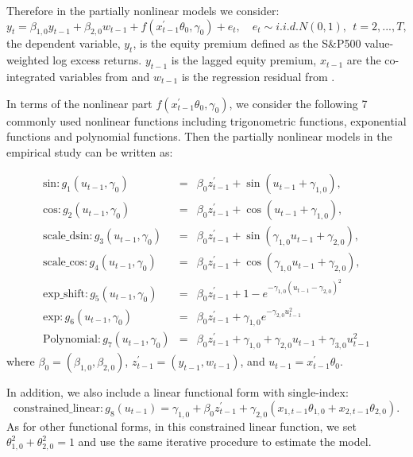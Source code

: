 \documentclass[a4paper,12pt,times,numbered,print,index]{report}
\numberwithin{equation}{section}
\begin{document}
Therefore in the partially nonlinear models we consider: 
$$
y_{t} = \beta_{1,0} y_{t-1} + \beta_{2,0} w_{t-1} + f\left( x_{t-1}^{\prime }\theta _{0},\gamma _{0}\right) +e_{t}, \quad
e_{t}\sim i.i.d.N\left( 0,1\right) ,\ \ t=2,...,T,
$$
the dependent variable, $y_t$, is the equity premium defined as the S\&P500 value-weighted log excess returns. $y_{t-1}$ is the lagged equity premium, $x_{t-1}$ are the co-integrated variables from \cite{zhou2018semiparametric} and $w_{t-1}$ is the regression residual from \cite{lettau2001consumption}. 

In terms of the nonlinear part $f\left( x_{t-1}^{\prime }\theta _{0},\gamma _{0}\right)$, we consider the following 7 commonly used nonlinear functions including trigonometric functions, exponential functions and polynomial functions. Then the partially nonlinear models in the empirical study can be written as:

\begin{eqnarray*}
	\text{sin}: g_{1}\left( u_{t-1},\gamma _{0}\right) &=& \beta _{0} z_{t-1}^{\prime} + \sin \left( u_{t-1}+\gamma_{1,0}\right),  \\
	\text{cos}: g_{2}\left( u_{t-1},\gamma _{0}\right) &=& \beta _{0} z_{t-1}^{\prime} + \cos \left( u_{t-1}+\gamma_{1,0}\right), \\
	\text{scale\_dsin}: g_{3}\left( u_{t-1},\gamma_{0}\right) &=& \beta _{0} z_{t-1}^{\prime} + \sin \left( \gamma_{1,0}u_{t-1}+\gamma_{2,0}\right),  \\
	\text{scale\_cos}: g_{4}\left( u_{t-1},\gamma_{0}\right) &=& \beta _{0} z_{t-1}^{\prime} + \cos \left( \gamma_{1,0}u_{t-1}+\gamma_{2,0}\right), \\
	\text{exp\_shift}: g_{5}\left( u_{t-1}, \gamma_{0}\right) &=&  \beta _{0} z_{t-1}^{\prime} + 1-e^{-\gamma_{1,0}\left(u_{t-1}-\gamma_{2,0}\right)^{2}} \\
	\text{exp}: g_{6}\left( u_{t-1},\gamma _{0}\right) &=&  \beta _{0} z_{t-1}^{\prime} + \gamma_{1,0} e^{-\gamma_{2,0}u_{t-1}^2}  \\
	\text{Polynomial}: g_{7}\left( u_{t-1},\gamma_{0}\right) &=& \beta _{0} z_{t-1}^{\prime} + \gamma_{1,0}+ \gamma_{2,0}u_{t-1}+\gamma_{3,0}u_{t-1}^{2}
\end{eqnarray*}%
where $\beta_{0} = (\beta_{1,0}, \beta_{2,0})$, $ z_{t-1}^{\prime } = (y_{t-1}, w_{t-1})$, and $u_{t-1} =  x_{t-1}^{\prime }\theta _{0}$.


In addition, we also include a linear functional form with single-index:
$$
\text{constrained\_linear}: g_8\left( u_{t-1}\right) = \gamma_{1,0} +\beta _{0} z_{t-1}^{\prime} + \gamma_{2,0}(x_{1,t-1}\theta _{1,0} + x_{2,t-1}\theta _{2,0}).
$$
As for other functional forms, in this constrained linear function, we set $\theta^2_{1,0}+\theta_{2,0}^2 = 1$ and use the same iterative procedure to estimate the model. 
\end{document}
